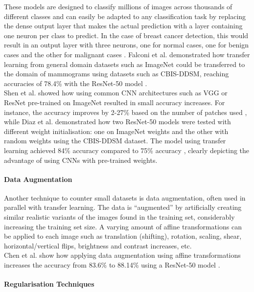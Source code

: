 These models are designed to classify millions of images across thousands of different classes and can easily be adapted to any classification task by replacing the dense output layer that makes the actual prediction with a layer containing one neuron per class to predict. In the case of breast cancer detection, this would result in an output layer with three neurons, one for normal cases, one for benign cases and the other for malignant cases \citep{Geron2019}. Falconi et al. demonstrated how transfer learning from general domain datasets such as ImageNet could be transferred to the domain of mammograms using datasets  such as CBIS-DDSM, reaching accuracies of 78.4\% with the ResNet-50 model \citep{Falconi2019}.\\

Shen et al. showed how using common CNN architectures such as VGG or ResNet pre-trained on ImageNet resulted in small accuracy increases. For instance, the accuracy improves by 2-27\% based on the number of patches used \citep{Shen2017}, while Diaz et al. demonstrated how two ResNet-50 models were tested with different weight initialisation: one on ImageNet weights and the other with random weights using the CBIS-DDSM dataset. The model using transfer learning achieved  84\% accuracy compared to 75\% accuracy \citep{Diaz2018}, clearly depicting the advantage of using CNNs with pre-trained weights. 

\paragraph{Data Augmentation}
\label{sec:litsurvey-data-augmentation}

Another technique to counter small datasets is data augmentation, often used in parallel with transfer learning. The data is ``augmented'' by artificially creating similar realistic variants of the images found in the training set, considerably increasing the training set size. A varying amount of affine transformations can be applied to each image such as translation (shifting), rotation, scaling, shear, horizontal/vertical flips, brightness and contrast increases, etc.\\

Chen et al. show how applying data augmentation using affine transformations increases the accuracy from 83.6\% to 88.14\% using a ResNet-50 model \citep{Chen2019}.

\paragraph{Regularisation Techniques}

